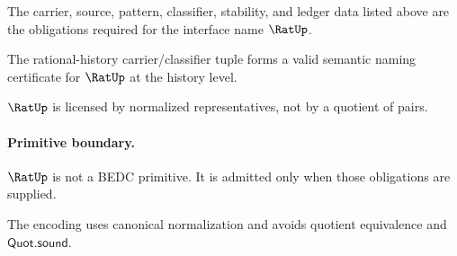 \begin{definition}
\label{def:rat-certificate-obligations}
The carrier, source, pattern, classifier, stability, and ledger data listed above are the obligations required for the interface name \(\RatUp\).
\end{definition}

\begin{theorem}
\label{thm:concrete-rat-namecert}
The rational-history carrier/classifier tuple forms a valid semantic naming certificate for $\RatUp$ at the history level.
\end{theorem}

\begin{corollary}
\label{cor:rat-licensed-not-primitive}
\(\RatUp\) is licensed by normalized representatives, not by a quotient of pairs.
\end{corollary}

\paragraph{Primitive boundary.}
\(\RatUp\) is not a BEDC primitive. It is admitted only when those obligations are supplied.

\begin{remark}
\label{rem:rat-zero-axiom-note}
The encoding uses canonical normalization and avoids quotient equivalence and
\(\mathsf{Quot.sound}\).
\end{remark}
